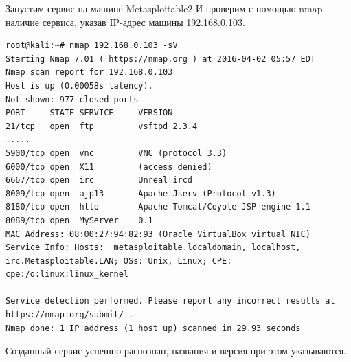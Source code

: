 \documentclass[10pt,a4paper]{report}
\begin{document}
Запустим сервис на машине Metasploitable2 И проверим с помощью nmap наличие сервиса, указав IP-адрес машины 192.168.0.103. 


\begin{verbatim}
root@kali:~# nmap 192.168.0.103 -sV 
Starting Nmap 7.01 ( https://nmap.org ) at 2016-04-02 05:57 EDT
Nmap scan report for 192.168.0.103
Host is up (0.00058s latency).
Not shown: 977 closed ports
PORT     STATE SERVICE     VERSION
21/tcp   open  ftp         vsftpd 2.3.4
.....
5900/tcp open  vnc         VNC (protocol 3.3)
6000/tcp open  X11         (access denied)
6667/tcp open  irc         Unreal ircd
8009/tcp open  ajp13       Apache Jserv (Protocol v1.3)
8180/tcp open  http        Apache Tomcat/Coyote JSP engine 1.1
8089/tcp open  MyServer    0.1
MAC Address: 08:00:27:94:82:93 (Oracle VirtualBox virtual NIC)
Service Info: Hosts:  metasploitable.localdomain, localhost, irc.Metasploitable.LAN; OSs: Unix, Linux; CPE: cpe:/o:linux:linux_kernel

Service detection performed. Please report any incorrect results at https://nmap.org/submit/ .
Nmap done: 1 IP address (1 host up) scanned in 29.93 seconds
\end{verbatim}
Созданный сервис успешно распознан, названия и версия при этом указываются.
\end{document}
